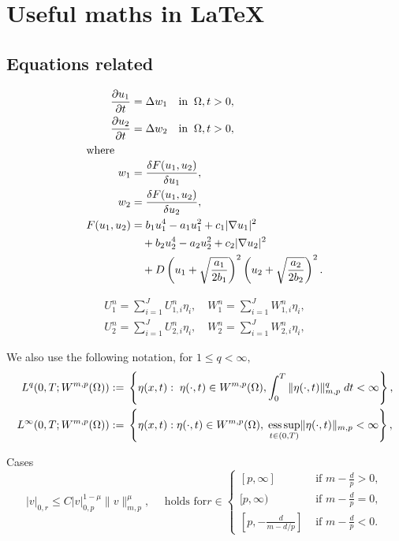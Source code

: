 \chapter{Useful maths in LaTeX}
\section{Equations related}

\begin{align} 
\frac{\partial u_{1}}{\partial t}&  = \Delta w_{1} \quad  \text{in}\;\;\Omega,t>0, \label{1a0001a}\\ 
\frac{\partial u_{2}}{\partial t}&  = \Delta w_{2} \quad \text{in}\;\;\Omega,t>0 ,\label{1a0001b}\\
\intertext{where}
w_{1}  &=  \frac{\delta F(u_{1},u_{2})}{\delta u_{1}}, \label{1a0001c}\\
w_{2}  &=  \frac{\delta F(u_{1},u_{2})}{\delta u_{2}},\label{1a0001d}\\ 
F(u_{1},u_{2})   &=   b_1u_1^4- a_1u_1^2+c_1|\nabla u_1|^2 \nonumber\\
   &\quad  + b_2u_2^4-  a_2u_2^2+c_2|\nabla u_2|^2 \nonumber\\
   &\quad  + D \left(u_1+ \sqrt{\frac{a_1}{2b_1}}\right )^2  \left(u_2+
       \sqrt{\frac{a_2}{2b_2}}\right)^2.\label{1a0001e}
\end{align}

\begin{align}
U^n_1=\sum_{i=1}^{J}U_{1,i}^n\eta_i,\quad W^n_1=\sum_{i=1}^{J}W_{1,i}^n\eta_i,\label{5E0001a}\\
U^n_2=\sum_{i=1}^{J}U_{2,i}^n\eta_i,\quad W^n_2=\sum_{i=1}^{J}W_{2,i}^n\eta_i,\label{5E0001b}
\end{align}

We also use the following notation, for $1 \leq q < \infty,$
\begin{align*}
L^{q}(0,T;W^{m,p}(\Omega)):=& \; \left\{ \eta(x,t):\;  \eta(\cdot,t) \in W^{m,p}(\Omega), \int_0^T  \|\eta(\cdot,t)\|_{m,p}^q\; dt < \infty\right \},\\
L^{\infty}(0,T;W^{m,p}(\Omega)):=& \; \left\{ \eta(x,t):
\eta(\cdot,t) \in W^{m,p}(\Omega)
,\; \displaystyle{\operatornamewithlimits{ess\,sup}_{t\in (0,T)}} \|\eta(\cdot,t)\|_{m,p} < \infty\right \},
\end{align*}

Cases
\begin{equation}
|v|_{0,r} \leq C|v|^{1-\mu}_{0,p} \|v\|^\mu_{m,p},\quad \text{ holds for
} 
r\in 
\begin{cases}
        [p,\infty]&  \mbox{ if }  m-\frac{d}{p} > 0,\\
        [p,\infty) &\mbox{ if } m-\frac{d}{p} = 0,\\
        [p,-\frac{d}{ m-d/p}]& \text{ if } m-\frac{d}{p} < 0.
\end{cases}\label{gagliar}
\end{equation}

